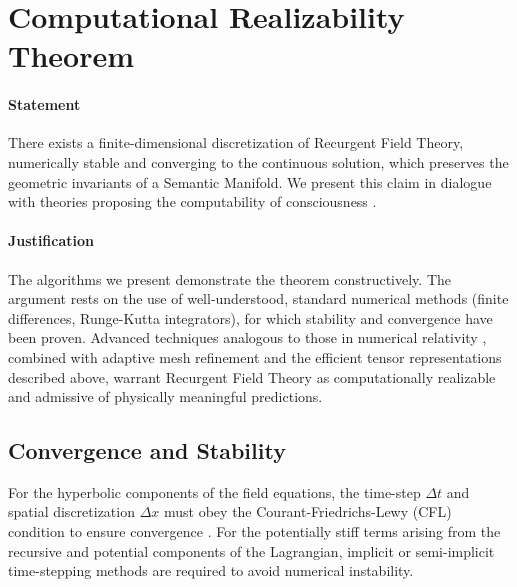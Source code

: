 
\section{Computational Realizability Theorem}
\label{17.5:computational_realizability_theorem}

\paragraph{Statement}

There exists a finite-dimensional discretization of Recurgent Field Theory, numerically stable and converging to the continuous solution, which preserves the geometric invariants of a Semantic Manifold. We present this claim in dialogue with theories proposing the computability of consciousness \autocite{KochConsciousness2019}.

\paragraph{Justification}
The algorithms we present demonstrate the theorem constructively. The argument rests on the use of well-understood, standard numerical methods (finite differences, Runge-Kutta integrators), for which stability and convergence have been proven. Advanced techniques analogous to those in numerical relativity \autocite{BaumgarteShapiro2010}, combined with adaptive mesh refinement and the efficient tensor representations described above, warrant Recurgent Field Theory as computationally realizable and admissive of physically meaningful predictions.

\subsection{Convergence and Stability}
\label{17.5.1:convergence_and_stability}

For the hyperbolic components of the field equations, the time-step \(\Delta t\) and spatial discretization \(\Delta x\) must obey the Courant-Friedrichs-Lewy (CFL) condition to ensure convergence \autocite{CourantFriedrichsLewy1928}. For the potentially stiff terms arising from the recursive and potential components of the Lagrangian, implicit or semi-implicit time-stepping methods are required to avoid numerical instability.


